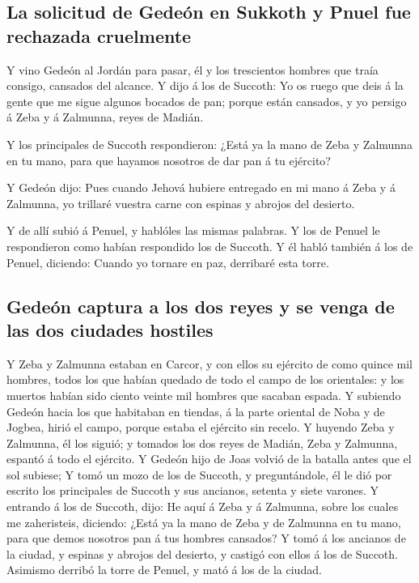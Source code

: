 \hypertarget{la-solicitud-de-gedeuxf3n-en-sukkoth-y-pnuel-fue-rechazada-cruelmente}{%
\subsection{La solicitud de Gedeón en Sukkoth y Pnuel fue rechazada
cruelmente}\label{la-solicitud-de-gedeuxf3n-en-sukkoth-y-pnuel-fue-rechazada-cruelmente}}

 Y vino Gedeón al Jordán para pasar, él y los trescientos
hombres que traía consigo, cansados del alcance.  Y dijo á
los de Succoth: Yo os ruego que deis á la gente que me sigue algunos
bocados de pan; porque están cansados, y yo persigo á Zeba y á Zalmunna,
reyes de Madián.

 Y los principales de Succoth respondieron: ¿Está ya la
mano de Zeba y Zalmunna en tu mano, para que hayamos nosotros de dar pan
á tu ejército?

 Y Gedeón dijo: Pues cuando Jehová hubiere entregado en mi
mano á Zeba y á Zalmunna, yo trillaré vuestra carne con espinas y
abrojos del desierto.

 Y de allí subió á Penuel, y hablóles las mismas palabras.
Y los de Penuel le respondieron como habían respondido los de Succoth.
 Y él habló también á los de Penuel, diciendo: Cuando yo
tornare en paz, derribaré esta torre.

\hypertarget{gedeuxf3n-captura-a-los-dos-reyes-y-se-venga-de-las-dos-ciudades-hostiles}{%
\subsection{Gedeón captura a los dos reyes y se venga de las dos
ciudades
hostiles}\label{gedeuxf3n-captura-a-los-dos-reyes-y-se-venga-de-las-dos-ciudades-hostiles}}

 Y Zeba y Zalmunna estaban en Carcor, y con ellos su
ejército de como quince mil hombres, todos los que habían quedado de
todo el campo de los orientales: y los muertos habían sido ciento veinte
mil hombres que sacaban espada.  Y subiendo Gedeón hacia
los que habitaban en tiendas, á la parte oriental de Noba y de Jogbea,
hirió el campo, porque estaba el ejército sin recelo.  Y
huyendo Zeba y Zalmunna, él los siguió; y tomados los dos reyes de
Madián, Zeba y Zalmunna, espantó á todo el ejército.  Y
Gedeón hijo de Joas volvió de la batalla antes que el sol subiese;
 Y tomó un mozo de los de Succoth, y preguntándole, él le
dió por escrito los principales de Succoth y sus ancianos, setenta y
siete varones.  Y entrando á los de Succoth, dijo: He
aquí á Zeba y á Zalmunna, sobre los cuales me zaheristeis, diciendo:
¿Está ya la mano de Zeba y de Zalmunna en tu mano, para que demos
nosotros pan á tus hombres cansados?  Y tomó á los
ancianos de la ciudad, y espinas y abrojos del desierto, y castigó con
ellos á los de Succoth.  Asimismo derribó la torre de
Penuel, y mató á los de la ciudad.

